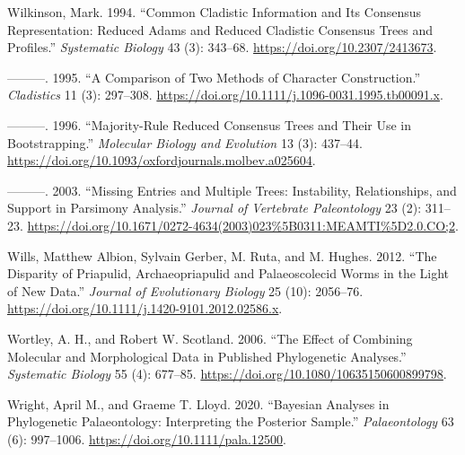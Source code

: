 \begin{CSLReferences}{1}{0}
\leavevmode{}%
Wilkinson, Mark. 1994. {``Common Cladistic Information and Its Consensus Representation: Reduced {Adams} and Reduced Cladistic Consensus Trees and Profiles.''} \emph{Systematic Biology} 43 (3): 343--68. \url{https://doi.org/10.2307/2413673}.

\leavevmode{}%
---------. 1995. {``A Comparison of Two Methods of Character Construction.''} \emph{Cladistics} 11 (3): 297--308. \url{https://doi.org/10.1111/j.1096-0031.1995.tb00091.x}.

\leavevmode{}%
---------. 1996. {``Majority-Rule Reduced Consensus Trees and Their Use in Bootstrapping.''} \emph{Molecular Biology and Evolution} 13 (3): 437--44. \url{https://doi.org/10.1093/oxfordjournals.molbev.a025604}.

\leavevmode{}%
---------. 2003. {``Missing Entries and Multiple Trees: Instability, Relationships, and Support in Parsimony Analysis.''} \emph{Journal of Vertebrate Paleontology} 23 (2): 311--23. \url{https://doi.org/10.1671/0272-4634(2003)023\%5B0311:MEAMTI\%5D2.0.CO;2}.

\leavevmode{}%
Wills, Matthew Albion, Sylvain Gerber, M. Ruta, and M. Hughes. 2012. {``The Disparity of Priapulid, Archaeopriapulid and Palaeoscolecid Worms in the Light of New Data.''} \emph{Journal of Evolutionary Biology} 25 (10): 2056--76. \url{https://doi.org/10.1111/j.1420-9101.2012.02586.x}.

\leavevmode{}%
Wortley, A. H., and Robert W. Scotland. 2006. {``The Effect of Combining Molecular and Morphological Data in Published Phylogenetic Analyses.''} \emph{Systematic Biology} 55 (4): 677--85. \url{https://doi.org/10.1080/10635150600899798}.

\leavevmode{}%
Wright, April M., and Graeme T. Lloyd. 2020. {``Bayesian Analyses in Phylogenetic Palaeontology: Interpreting the Posterior Sample.''} \emph{Palaeontology} 63 (6): 997--1006. \url{https://doi.org/10.1111/pala.12500}.

\end{CSLReferences}



\address{%
Martin R. Smith\\
University of Durham\\%
Department of Earth Sciences\\ Durham, UK\\ DH1 3LE\\
%
\url{https://smithlabdurham.github.io/}\\%
\textit{ORCiD: \href{https://orcid.org/0000-0001-5660-1727}{0000-0001-5660-1727}}\\%
\href{mailto:martin.smith@durham.ac.uk}{\nolinkurl{martin.smith@durham.ac.uk}}%
}
